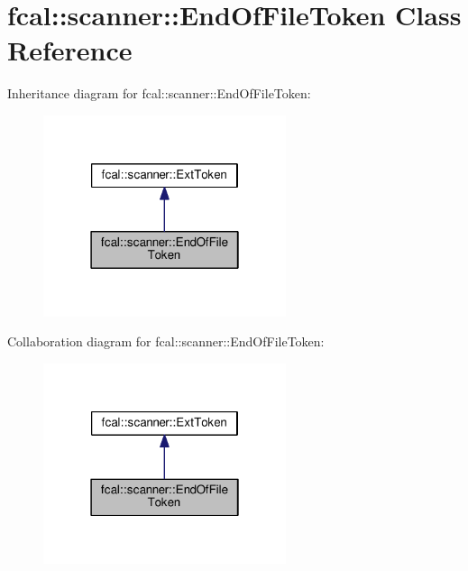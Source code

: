 \hypertarget{classfcal_1_1scanner_1_1EndOfFileToken}{}\section{fcal\+:\+:scanner\+:\+:End\+Of\+File\+Token Class Reference}
\label{classfcal_1_1scanner_1_1EndOfFileToken}


Inheritance diagram for fcal\+:\+:scanner\+:\+:End\+Of\+File\+Token\+:
\nopagebreak
\begin{figure}[H]
\begin{center}
\leavevmode
\includegraphics[width=202pt]{classfcal_1_1scanner_1_1EndOfFileToken__inherit__graph}
\end{center}
\end{figure}


Collaboration diagram for fcal\+:\+:scanner\+:\+:End\+Of\+File\+Token\+:
\nopagebreak
\begin{figure}[H]
\begin{center}
\leavevmode
\includegraphics[width=202pt]{classfcal_1_1scanner_1_1EndOfFileToken__coll__graph}
\end{center}
\end{figure}
